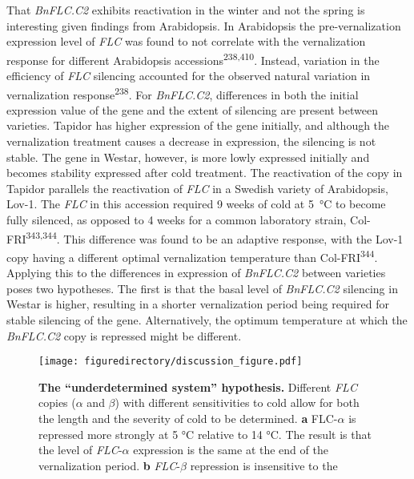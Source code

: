 \documentclass[12pt,]{book}
\begin{document}
That \emph{BnFLC.C2} exhibits reactivation in the winter and not the
spring is interesting given findings from Arabidopsis. In Arabidopsis
the pre-vernalization expression level of \emph{FLC} was found to not
correlate with the vernalization response for different Arabidopsis
accessions\textsuperscript{238,410}. Instead, variation in the
efficiency of \emph{FLC} silencing accounted for the observed natural
variation in vernalization response\textsuperscript{238}. For
\emph{BnFLC.C2}, differences in both the initial expression value of the
gene and the extent of silencing are present between varieties. Tapidor
has higher expression of the gene initially, and although the
vernalization treatment causes a decrease in expression, the silencing
is not stable. The gene in Westar, however, is more lowly expressed
initially and becomes stability expressed after cold treatment. The
reactivation of the copy in Tapidor parallels the reactivation of
\emph{FLC} in a Swedish variety of Arabidopsis, Lov-1. The \emph{FLC} in
this accession required 9 weeks of cold at 5~°C to become fully
silenced, as opposed to 4 weeks for a common laboratory strain,
Col-FRI\textsuperscript{343,344}. This difference was found to be an
adaptive response, with the Lov-1 copy having a different optimal
vernalization temperature than Col-FRI\textsuperscript{344}. Applying
this to the differences in expression of \emph{BnFLC.C2} between
varieties poses two hypotheses. The first is that the basal level of
\emph{BnFLC.C2} silencing in Westar is higher, resulting in a shorter
vernalization period being required for stable silencing of the gene.
Alternatively, the optimum temperature at which the \emph{BnFLC.C2} copy
is repressed might be different.

\begin{figure}[htbp]
\centering
\texttt{[image: figuredirectory/discussion\_figure.pdf]}
\caption{\textbf{The ``underdetermined system'' hypothesis.} Different
\emph{FLC} copies (\(\alpha\) and \(\beta\)) with different
sensitivities to cold allow for both the length and the severity of cold
to be determined. \textbf{a} FLC-\(\alpha\) is repressed more strongly
at 5 °C relative to 14 °C. The result is that the level of
\emph{FLC}-\(\alpha\) expression is the same at the end of the
vernalization period. \textbf{b} \emph{FLC}-\(\beta\) repression is
insensitive to the}\label{figure:3xx:underdetermined}
\end{figure}
\end{document}
